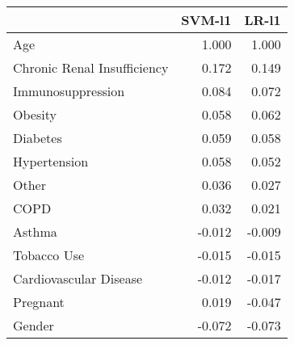 \begin{tabular}{lrr}
\toprule
{} &  SVM-l1 &  LR-l1 \\
\midrule
Age                         &   1.000 &  1.000 \\
Chronic Renal Insufficiency &   0.172 &  0.149 \\
Immunosuppression           &   0.084 &  0.072 \\
Obesity                     &   0.058 &  0.062 \\
Diabetes                    &   0.059 &  0.058 \\
Hypertension                &   0.058 &  0.052 \\
Other                       &   0.036 &  0.027 \\
COPD                        &   0.032 &  0.021 \\
Asthma                      &  -0.012 & -0.009 \\
Tobacco Use                 &  -0.015 & -0.015 \\
Cardiovascular Disease      &  -0.012 & -0.017 \\
Pregnant                    &   0.019 & -0.047 \\
Gender                      &  -0.072 & -0.073 \\
\bottomrule
\end{tabular}
